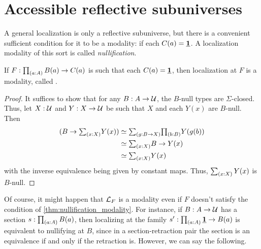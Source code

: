 \section{Accessible reflective subuniverses}
A general localization is only a reflective subuniverse, but there is a convenient sufficient condition for it to be a modality: if each $C(a)=\underline{\mathbf{1}}$.
A localization modality of this sort is called \emph{nullification}.

\begin{thm}\label{thm:nullification_modality}
  If $F:\prd{a:A} B(a) \to C(a)$ is such that each $C(a)=\underline{\mathbf{1}}$, then localization at $F$ is a modality, called .
\end{thm}
\begin{proof}
  It suffices to show that for any $B:A\to\mathcal{U}$, the $B$-null types are $\Sigma$-closed.
  Thus, let $X:\mathcal{U}$ and $Y:X\to \mathcal{U}$ be such that $X$ and each $Y(x)$ are $B$-null.
  Then
  \begin{align*}
    (B\to \sm{x:X} Y(x))
    &\eqvsym \sm{g:B\to X} \prd{b:B} Y(g(b)) \\
    &\eqvsym \sm{x:X} B \to Y(x) \\
    &\eqvsym \sm{x:X} Y(x)
  \end{align*}
  with the inverse equivalence being given by constant maps.
  Thus, $\sm{x:X} Y(x)$ is $B$-null.
\end{proof}

Of course, it might happen that $\mathcal{L}_{F}$ is a modality even if $F$ doesn't satisfy the condition of \cref{thm:nullification_modality}.
For instance, if $B:A\to \mathcal{U}$ has a section $s:\prd{a:A} B(a)$, then localizing at the family $s' : \prd{a:A} \unit \to B(a)$ is equivalent to nullifying at $B$, since in a section-retraction pair the section is an equivalence if and only if the retraction is.
However, we can say the following.

